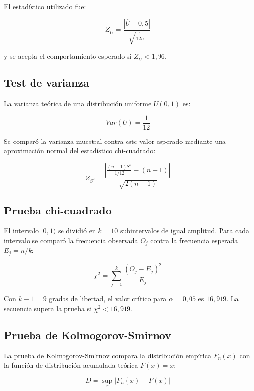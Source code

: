 \documentclass{article}
\begin{document}
El estadístico utilizado fue:

\begin{equation}
    Z_{\bar{U}} =
    \frac{|\bar{U} - 0{,}5|}{\sqrt{\frac{1}{12n}}}
\end{equation}

\noindent y se acepta el comportamiento esperado si $Z_{\bar{U}} < 1{,}96$.

\subsection{Test de varianza}

La varianza teórica de una distribución uniforme $U(0,1)$ es:

\begin{equation}
    Var(U) = \frac{1}{12}
\end{equation}

Se comparó la varianza muestral contra este valor esperado mediante una
aproximación normal del estadístico chi-cuadrado:

\begin{equation}
    Z_{S^2} =
    \frac{\left| \frac{(n-1)S^2}{1/12} - (n-1) \right|}
    {\sqrt{2(n-1)}}
\end{equation}

\subsection{Prueba chi-cuadrado}

El intervalo $[0,1)$ se dividió en $k = 10$ subintervalos de igual amplitud. Para
cada intervalo se comparó la frecuencia observada $O_j$ contra la frecuencia
esperada $E_j = n/k$:

\begin{equation}
    \chi^2 = \sum_{j=1}^{k} \frac{(O_j - E_j)^2}{E_j}
\end{equation}

Con $k-1 = 9$ grados de libertad, el valor crítico para $\alpha = 0{,}05$ es
$16{,}919$. La secuencia supera la prueba si $\chi^2 < 16{,}919$.

\subsection{Prueba de Kolmogorov-Smirnov}

La prueba de Kolmogorov-Smirnov compara la distribución empírica $F_n(x)$ con la
función de distribución acumulada teórica $F(x) = x$:

\begin{equation}
    D = \sup_x |F_n(x) - F(x)|
\end{equation}
\end{document}
